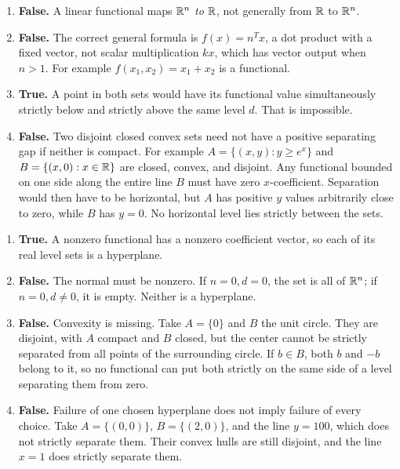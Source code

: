 \begin{enumerate}[label=(\alph*)]
\item \textbf{False.} A linear functional maps $\mathbb{R}^n$ \emph{to} $\mathbb{R}$,
not generally from $\mathbb{R}$ to $\mathbb{R}^n$.
\item \textbf{False.} The correct general formula is $f(x)=n^Tx$,
a dot product with a fixed vector, not scalar multiplication $kx$, which
has vector output when $n>1$. For example $f(x_1,x_2)=x_1+x_2$ is a functional.
\item \textbf{True.} A point in both sets would have its functional
value simultaneously strictly below and strictly above the same level $d$.
That is impossible.
\item \textbf{False.} Two disjoint closed convex sets need not have a
positive separating gap if neither is compact. For example
$A=\{(x,y):y\ge e^x\}$ and $B=\{(x,0):x\in\mathbb{R}\}$ are closed, convex,
and disjoint. Any functional bounded on one side along the entire line
$B$ must have zero $x$-coefficient. Separation would then have to be
horizontal, but $A$ has positive $y$ values arbitrarily close to zero,
while $B$ has $y=0$. No horizontal level lies strictly between the sets.
\end{enumerate}

\begin{enumerate}[label=(\alph*)]
\item \textbf{True.} A nonzero functional has a nonzero coefficient vector,
so each of its real level sets is a hyperplane.
\item \textbf{False.} The normal must be nonzero. If $n=0,d=0$, the
set is all of $\mathbb{R}^n$; if $n=0,d\ne0$, it is empty. Neither is a hyperplane.
\item \textbf{False.} Convexity is missing. Take $A=\{0\}$ and $B$ the
unit circle. They are disjoint, with $A$ compact and $B$ closed, but the
center cannot be strictly separated from all points of the surrounding circle.
If $b\in B$, both $b$ and $-b$ belong to it, so no functional can put both
strictly on the same side of a level separating them from zero.
\item \textbf{False.} Failure of one chosen hyperplane does not imply
failure of every choice. Take $A=\{(0,0)\}$, $B=\{(2,0)\}$, and the
line $y=100$, which does not strictly separate them. Their convex hulls
are still disjoint, and the line $x=1$ does strictly separate them.
\end{enumerate}

